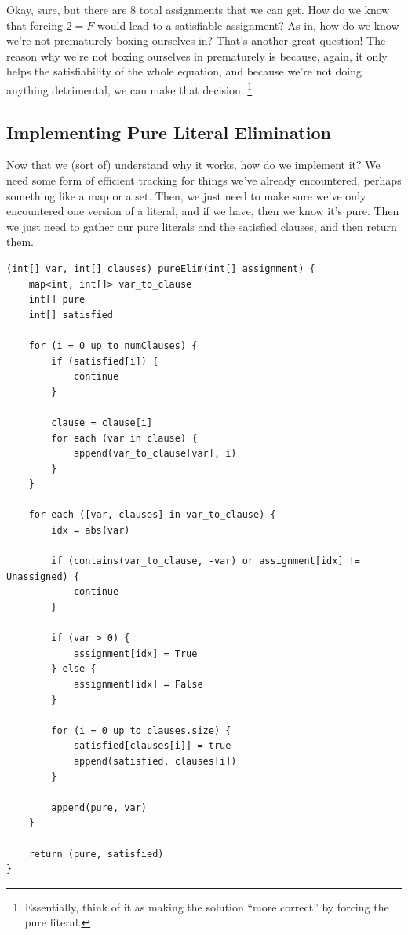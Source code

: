 \documentclass[oneside]{book}
\begin{document}
Okay, sure, but there are 8 total assignments that we can get. How do we know that forcing 
$2 = F$ would lead to a satisfiable assignment? As in, how do we know we're not prematurely 
boxing ourselves in? That's another great question! The reason why we're not boxing ourselves 
in prematurely is because, again, it only helps the satisfiability of the whole equation, 
and because we're not doing anything detrimental, we can make that decision.
\footnote{Essentially, think of it as making the solution ``more correct'' 
by forcing the pure literal.}

\subsection{Implementing Pure Literal Elimination}

Now that we (sort of) understand why it works, how do we implement it?
We need some form of efficient tracking for things we've already encountered, perhaps 
something like a map or a set. Then, we just need to make sure we've only encountered 
one version of a literal, and if we have, then we know it's pure. Then we just need 
to gather our pure literals and the satisfied clauses, and then return them. 

\begin{lstlisting}
(int[] var, int[] clauses) pureElim(int[] assignment) {
    map<int, int[]> var_to_clause
    int[] pure
    int[] satisfied

    for (i = 0 up to numClauses) {
        if (satisfied[i]) {
            continue
        }

        clause = clause[i]
        for each (var in clause) {
            append(var_to_clause[var], i)
        }
    }
    
    for each ([var, clauses] in var_to_clause) {
        idx = abs(var)

        if (contains(var_to_clause, -var) or assignment[idx] != Unassigned) {
            continue
        }

        if (var > 0) {
            assignment[idx] = True
        } else {
            assignment[idx] = False
        }

        for (i = 0 up to clauses.size) {
            satisfied[clauses[i]] = true
            append(satisfied, clauses[i])
        }

        append(pure, var)
    }

    return (pure, satisfied)
}
\end{lstlisting}
\end{document}
